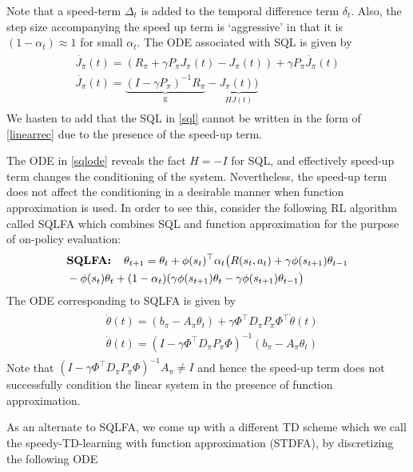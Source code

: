 Note that a speed-term $\Delta_t$ is added to the temporal difference term $\delta_t$. Also, the step size accompanying the speed up term is `aggressive’ in that it is $(1-\alpha_t)\approx 1$ for small $\alpha_t$. The ODE associated with SQL is given by
\begin{align}\label{sqlode}
\begin{split}
\dot{J_\pi}(t)=(R_\pi+\gamma P_\pi J_\pi(t) -J_\pi(t))+\gamma P_\pi\dot{J_\pi}(t)\\
\dot{J_\pi}(t)=\underbrace{(I-\gamma P_\pi)^{-1}R_\pi}_{\text{g}}-\underbrace{J_\pi(t))}_{HJ(t)}
\end{split}
\end{align}
We hasten to add that the SQL in \eqref{sql} cannot be written in the form of \eqref{linearrec} due to the presence of the speed-up term.\par 
The ODE in \eqref{sqlode} reveals the fact $H=-I$ for SQL, and effectively speed-up term changes the conditioning of the system. Nevertheless, the speed-up term does not affect the conditioning in a desirable manner when function approximation is used. In order to see this, consider the following RL algorithm called SQLFA which combines SQL and function approximation for the purpose of on-policy evaluation:
\begin{align}\label{sqlfa}
\begin{split}
&\textbf{SQLFA:\quad}\theta_{t+1}=\theta_t+\phi(s_t)^\top \alpha_t\big(R(s_t,a_t)+\gamma \phi(s_{t+1})\theta_{t-1}\\&-\phi(s_t)\theta_t +(1-\alpha_t)(\gamma \phi(s_{t+1})\theta_t-\gamma \phi(s_{t+1})\theta_{t-1}\big)
\end{split}
\end{align}
The ODE corresponding to SQLFA is given by
\begin{align}
\begin{split}
&\dot{\theta}(t)=(b_\pi-A_\pi\theta_t)+\gamma\Phi^\top D_\pi P_\pi\Phi^\top\dot{\theta}(t)\\
&\dot{\theta}(t)=(I-\gamma\Phi^\top D_\pi P_\pi\Phi)^{-1}(b_\pi-A_\pi\theta_t)
\end{split}
\end{align}
Note that $(I-\gamma\Phi^\top D_\pi P_\pi\Phi)^{-1}A_\pi\neq I$ and hence the speed-up term does not successfully condition the linear system in the presence of function approximation.\par
As an alternate to SQLFA, we come up with a different TD scheme which we call the speedy-TD-learning with function approximation (STDFA), by discretizing the following ODE
